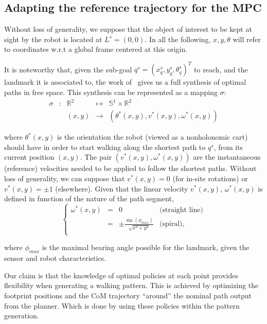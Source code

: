 \subsection{Adapting the reference trajectory for the MPC}

Without loss of generality, we suppose that the object of interest to be kept at sight by the robot is located at $L^s = (0,0)$. In all the following, $x,y,\theta$ will refer to coordinates w.r.t a global frame centered at this origin.

It is noteworthy that, given the sub-goal $q^s =(x_q^s,y_q^s,\theta_q^s)^T$ to reach, and the landmark it is associated to, the work of~\citep{Salaris:2010} gives us a full synthesis of optimal paths in free space. This synthesis can be represented as a mapping $\sigma$:
$$
\begin{array}{cccccc}
\sigma & : & \mathbb{R}^2 & \mapsto & \mathbb{S}^1 \times \mathbb{R}^2\\
& & (x,y) & \rightarrow & (\theta^*(x,y),v^*(x,y),\omega^*(x,y))
\end{array}
$$

\noindent where $\theta^*(x,y)$ is the orientation the robot (viewed as a nonholonomic cart)  should have in order to start walking along the shortest path to $q^s$, from its current position $(x,y)$. The pair $(v^*(x,y),\omega^*(x,y))$ are the instantaneous (reference) velocities needed to be applied to follow the shortest paths. Without loss of generality, we can suppose that $v^*(x,y)=0$ (for in-site rotations) or $v^*(x,y)=\pm 1$ (elsewhere). Given that the linear velocity $v^*(x,y)$, $\omega^*(x,y)$ is defined in function of the nature  of the path segment,
$$
\left\{
\begin{array}{cccc}
 \omega^*(x,y) & = & 0 & \mbox{(straight line)}\\
  & = & \pm\frac{\sin(\phi_{max})}{\sqrt{x^2+y^2}} & \mbox{(spiral)},\\
\end{array}
\right.
$$

\noindent where $\phi_{max}$ is the maximal bearing angle possible for the landmark, given the sensor and robot characteristics.

Our claim is that the knowledge of optimal policies at each point provides flexibility when generating a walking pattern. This is achieved by optimizing the footprint positions and the CoM trajectory ``around'' the nominal path output from the planner. Which is done by using these policies within the pattern generation.

